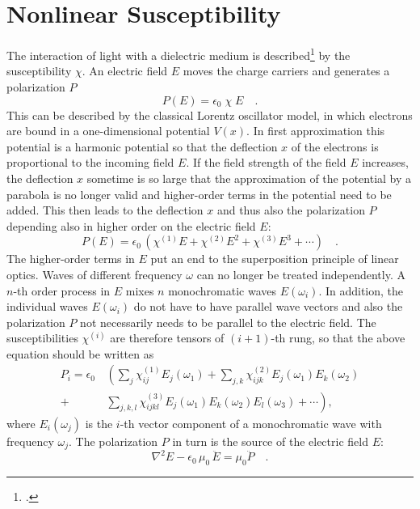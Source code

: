 \section{Nonlinear Susceptibility}

The interaction of light with a dielectric medium is described\footcite{MilonniEberly1988,Yariv1989} by the  susceptibility $\chi$.
An electric field $E$ moves the
charge carriers and generates a polarization $P$
\begin{equation}
  P(E) = \epsilon_0 \; \chi \; E \quad.
\end{equation}
This can be described by the classical Lorentz oscillator model,
in which electrons are bound  in a one-dimensional potential $V(x)$. In first approximation this potential is a
harmonic potential so that the deflection
$x$ of the electrons is proportional to the incoming field $E$.
If the field strength of the field $E$ increases, the deflection
$x$ sometime is so large that the approximation of the potential by a
parabola is no longer valid and higher-order terms in the
potential need to be added. This then leads to the deflection
$x$ and thus also the polarization $P$ depending also in higher
order  on the electric field $E$:
\begin{equation}
  P(E) = \epsilon_0 \, \left( \chi^{(1)} E + \chi^{(2)} E^2 + \chi^{(3)}
  E^3 + \cdots \right)  \quad .
\end{equation}
The higher-order terms in $E$  put an end to the 
superposition principle of linear optics. Waves of different
frequency $\omega$ can no longer be treated independently.
A $n$-th order process in $E$ mixes $n$ monochromatic
waves $E(\omega_i)$. In addition, the individual waves
$E(\omega_i)$ do not have to have parallel wave vectors and also the
polarization $P$ not necessarily needs to be parallel to the electric field. The susceptibilities $\chi^{(i)}$ are therefore tensors of
$(i+1)$-th rung, so that the above equation
 should be written as
\begin{align}
  P_i = \epsilon_0 \, & \left(  \sum_j \chi^{(1)}_{ij} E_j(\omega_1)
     + \sum_{j,k} \chi^{(2)}_{ijk} E_j(\omega_1) E_k(\omega_2)  \right. \nonumber \\+
     & \left.
    \sum_{j,k,l} \chi^{(3)}_{ijkl} E_j(\omega_1) E_k(\omega_2) E_l(\omega_3) + \cdots \right)  ,
\end{align}
where $E_i(\omega_j)$ is the $i$-th vector component of a
monochromatic wave with frequency $\omega_j$. The
polarization $P$ in turn is the source of the electric field $E$:
\begin{equation}
   \nabla^2 E - \epsilon_0 \, \mu_0 \, \ddot{E} = \mu_0 \ddot{P}  \quad .
   \label{eq:shg_wave_equation}
\end{equation}

